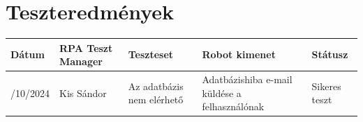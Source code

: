 \documentclass[
]{thesis-ekf}
\theoremstyle{definition}
\theoremstyle{remark}
\begin{document}
\section{Teszteredmények}\label{Teszteredmenyek}
\begin{table}[!ht]
	\centering
	\setlength{\extrarowheight}{3pt}
	
	\begin{tabularx}{\textwidth}{|>{\centering}X
			|>{\centering}X
			|>{\centering}X
			|>{\centering}X
			|>{\centering\arraybackslash}X
			|}
		\hline
		\rowcolor{gray!15}
		Dátum &
		RPA Teszt Manager &
		Teszteset&
		Robot kimenet&
		Státusz
		\\
		\hline
		20/10/2024
		&Kis Sándor
		&Az adatbázis nem elérhető
		&Adatbázishiba e-mail küldése a felhasználónak
		&Sikeres teszt
		\\
		\hline	
	\end{tabularx}
	
\end{table}
\end{document}
